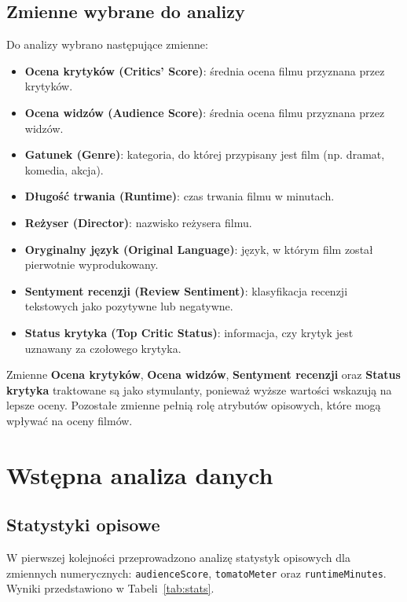 \documentclass[a4paper,12pt]{article}
\begin{document}
\subsection{Zmienne wybrane do analizy}

Do analizy wybrano następujące zmienne:

\begin{itemize}
    \item \textbf{Ocena krytyków (Critics' Score)}: średnia ocena filmu przyznana przez krytyków.
    \item \textbf{Ocena widzów (Audience Score)}: średnia ocena filmu przyznana przez widzów.
    \item \textbf{Gatunek (Genre)}: kategoria, do której przypisany jest film (np. dramat, komedia, akcja).
    \item \textbf{Długość trwania (Runtime)}: czas trwania filmu w minutach.
    \item \textbf{Reżyser (Director)}: nazwisko reżysera filmu.
    \item \textbf{Oryginalny język (Original Language)}: język, w którym film został pierwotnie wyprodukowany.
    \item \textbf{Sentyment recenzji (Review Sentiment)}: klasyfikacja recenzji tekstowych jako pozytywne lub negatywne.
    \item \textbf{Status krytyka (Top Critic Status)}: informacja, czy krytyk jest uznawany za czołowego krytyka.
\end{itemize}

Zmienne \textbf{Ocena krytyków}, \textbf{Ocena widzów}, \textbf{Sentyment recenzji} oraz \textbf{Status krytyka} traktowane są jako stymulanty, ponieważ wyższe wartości wskazują na lepsze oceny. Pozostałe zmienne pełnią rolę atrybutów opisowych, które mogą wpływać na oceny filmów.

\section{Wstępna analiza danych}

\subsection{Statystyki opisowe}

W pierwszej kolejności przeprowadzono analizę statystyk opisowych dla zmiennych numerycznych: \texttt{audienceScore}, \texttt{tomatoMeter} oraz \texttt{runtimeMinutes}. Wyniki przedstawiono w Tabeli~\ref{tab:stats}. 
\end{document}
